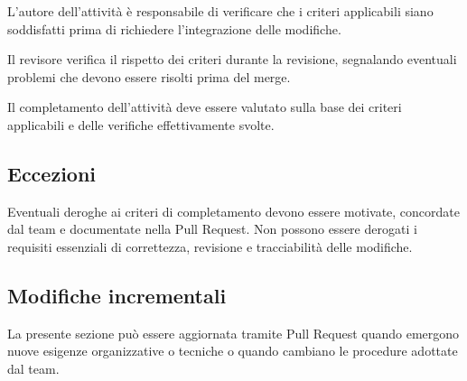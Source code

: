 \documentclass[11pt, a4paper]{article}
\begin{document}
L'autore dell'attività è responsabile di verificare che i criteri applicabili siano soddisfatti prima di richiedere l'integrazione delle modifiche.

Il revisore verifica il rispetto dei criteri durante la revisione, segnalando eventuali problemi che devono essere risolti prima del merge.

Il completamento dell'attività deve essere valutato sulla base dei criteri applicabili e delle verifiche effettivamente svolte.

\subsection{Eccezioni}

Eventuali deroghe ai criteri di completamento devono essere motivate, concordate dal team e documentate nella Pull Request. Non possono essere derogati i requisiti essenziali di correttezza, revisione e tracciabilità delle modifiche.

\subsection{Modifiche incrementali}

La presente sezione può essere aggiornata tramite Pull Request quando emergono nuove esigenze organizzative o tecniche o quando cambiano le procedure adottate dal team.
\end{document}
